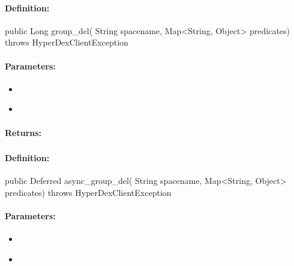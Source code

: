 \paragraph{Definition:}
\begin{javacode}
public Long group_del(
        String spacename,
        Map<String, Object> predicates) throws HyperDexClientException
\end{javacode}

\paragraph{Parameters:}
\begin{itemize}[noitemsep]
\item {}\\

\item {}\\

\end{itemize}

\paragraph{Returns:}


\pagebreak
\subsubsection{}
\label{api:java:async_group_del}


\paragraph{Definition:}
\begin{javacode}
public Deferred async_group_del(
        String spacename,
        Map<String, Object> predicates) throws HyperDexClientException
\end{javacode}

\paragraph{Parameters:}
\begin{itemize}[noitemsep]
\item {}\\

\item {}\\

\end{itemize}

